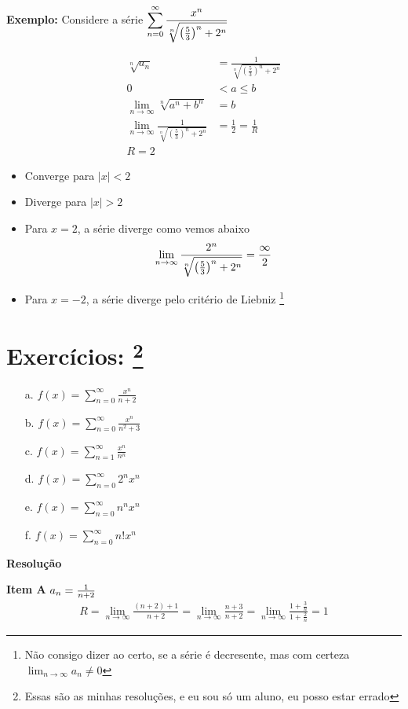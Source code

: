 \documentclass[12pt,openany, letterpaper]{book}
\newcommand{\LI}[1][n]{\lim_{{#1} \rightarrow \infty}}
\newcommand{\soma}[2][n]{\sum_{{#1} = #2}^\infty}
\newcommand{\Resolve}{\begin{center} \textbf{Resolução} \end{center}}
\begin{document}
{{\textbf{Exemplo:} Considere a série $\displaystyle{\soma{0} {x^n \over \sqrt[n]{\left(\frac{5}{3}\right)^n + 2^n}}}$ \vspace{7mm}

\begin{align*}
\sqrt[n]{a_n} &= \frac{1}{\sqrt[n]{\left(\frac{5}{3}\right)^n + 2^n}} \\
0 &< a \leq b \\
\LI \sqrt[n]{a^n + b^n} &= b \\
\LI \frac{1}{\sqrt[n]{\left(\frac{5}{3}\right)^n + 2^n}} &= \frac{1}{2} = \frac{1}{R} \\
R = 2
\end{align*}

\begin{itemize}
\item Converge para $|x| < 2$
\item Diverge para $|x| > 2$
\item Para $x = 2$, a série diverge como vemos abaixo $$\LI \frac{2^n}{\sqrt[n]{\left(\frac{5}{3}\right)^n + 2^n}} = {\infty \over 2} $$
\item Para $x = -2$, a série diverge pelo critério de Liebniz \footnote{Não consigo dizer ao certo, se a série é decresente, mas com certeza $\LI a_n \neq 0$}
\end{itemize}

\section*{Exercícios: \footnote{Essas são as minhas resoluções, e eu sou só um aluno, eu posso estar errado}}
\begin{multicols}{3}
\begin{itemize}
\item [a.] $f(x) = \displaystyle{\soma{0} \frac{x^n}{n+2}}$
\item [b.] $f(x) = \displaystyle{\soma{0} \frac{x^n}{n^2+3}}$
\item [c.] $f(x) = \displaystyle{\soma{1} \frac{x^n}{n^n}}$
\item [d.] $f(x) = \displaystyle{\soma{0} 2^n x^n}$
\item [e.] $f(x) = \displaystyle{\soma{0} n^n x^n}$
\item [f.] $f(x) = \displaystyle{\soma{0} n! x^n}$
\end{itemize}
\end{multicols}

\Resolve

\textbf{Item A
} $a_n = {1 \over n+2}$
\begin{align*}
R = \LI \frac{(n+2)+1}{n+2} = \LI \frac{n+3}{n+2} = \LI \frac{1 + \frac{3}{n}}{1 + \frac{2}{n}} = 1
\end{align*}

}}
\end{document}
